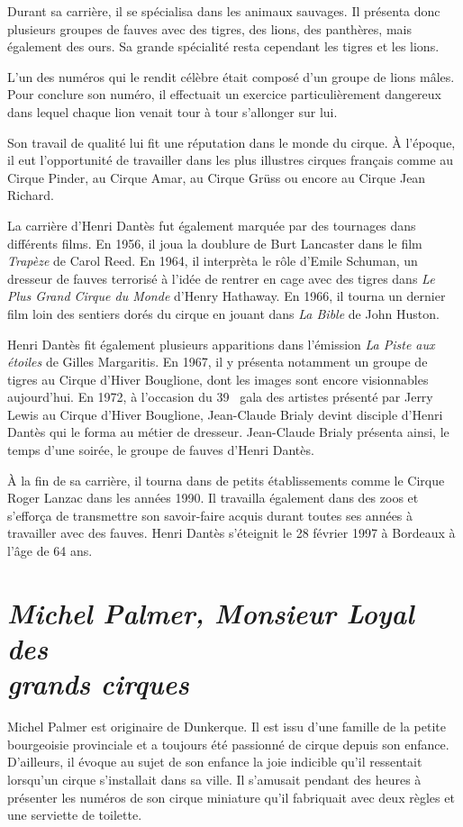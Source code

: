 Durant sa carrière, il se spécialisa dans les animaux sauvages. Il présenta donc plusieurs groupes de fauves avec des tigres, des lions, des panthères, mais également des ours. Sa grande spécialité resta cependant les tigres et les lions.

L’un des numéros qui le rendit célèbre était composé d’un groupe de lions mâles. Pour conclure son numéro, il effectuait un exercice particulièrement dangereux dans lequel chaque lion venait tour à tour s’allonger sur lui.

Son travail de qualité lui fit une réputation dans le monde du cirque. À l'époque, il eut l'opportunité de travailler dans les plus illustres cirques français comme au Cirque Pinder, au Cirque Amar, au Cirque Grüss ou encore au Cirque Jean Richard.

La carrière d’Henri Dantès fut également marquée par des tournages dans différents films. En 1956, il joua la doublure de Burt Lancaster dans le film \textit{Trapèze} de Carol Reed. En 1964, il interprèta le rôle d’Emile Schuman, un dresseur de fauves terrorisé à l’idée de rentrer en cage avec des tigres dans \textit{Le Plus Grand Cirque du Monde} d'Henry Hathaway. En 1966, il tourna un dernier film loin des sentiers dorés du cirque en jouant dans \textit{La Bible} de John Huston.

Henri Dantès fit également plusieurs apparitions dans l’émission \textit{La Piste aux étoiles} de Gilles Margaritis. En 1967, il y présenta notamment un groupe de tigres au Cirque d’Hiver Bouglione, dont les images sont encore visionnables aujourd’hui. En 1972, à l’occasion du 39\ieme~ gala des artistes présenté par Jerry Lewis au Cirque d’Hiver Bouglione, Jean-Claude Brialy devint disciple d'Henri Dantès qui le forma au métier de dresseur. Jean-Claude Brialy présenta ainsi, le temps d'une soirée, le groupe de fauves d’Henri Dantès.

À la fin de sa carrière, il tourna dans de petits établissements comme le Cirque Roger Lanzac dans les années 1990. Il travailla également dans des zoos et s’efforça de transmettre son savoir-faire acquis durant toutes ses années à travailler avec des fauves. Henri Dantès s’éteignit le 28 février 1997 à Bordeaux à l’âge de 64 ans.

\section*{\textit{Michel Palmer, Monsieur Loyal des \\
		 grands cirques}}
{}
\noindent
Michel Palmer est originaire de Dunkerque. Il est issu d’une famille de la petite bourgeoisie provinciale et a toujours été passionné de cirque depuis son enfance. D’ailleurs, il évoque au sujet de son enfance la joie indicible qu’il ressentait lorsqu’un cirque s’installait dans sa ville. Il s’amusait pendant des heures à présenter les numéros de son cirque miniature qu’il fabriquait avec deux règles et une serviette de toilette.

